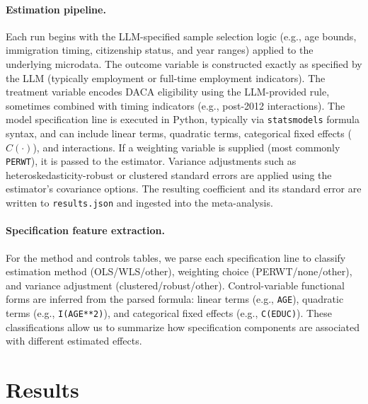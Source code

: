 \documentclass[11pt]{article}
\begin{document}
\paragraph{Estimation pipeline.} Each run begins with the LLM-specified sample selection logic (e.g., age bounds, immigration timing, citizenship status, and year ranges) applied to the underlying microdata. The outcome variable is constructed exactly as specified by the LLM (typically employment or full-time employment indicators). The treatment variable encodes DACA eligibility using the LLM-provided rule, sometimes combined with timing indicators (e.g., post-2012 interactions). The model specification line is executed in Python, typically via \texttt{statsmodels} formula syntax, and can include linear terms, quadratic terms, categorical fixed effects ($C(\cdot)$), and interactions. If a weighting variable is supplied (most commonly \texttt{PERWT}), it is passed to the estimator. Variance adjustments such as heteroskedasticity-robust or clustered standard errors are applied using the estimator's covariance options. The resulting coefficient and its standard error are written to \texttt{results.json} and ingested into the meta-analysis.

\paragraph{Specification feature extraction.} For the method and controls tables, we parse each specification line to classify estimation method (OLS/WLS/other), weighting choice (PERWT/none/other), and variance adjustment (clustered/robust/other). Control-variable functional forms are inferred from the parsed formula: linear terms (e.g., \texttt{AGE}), quadratic terms (e.g., \texttt{I(AGE**2)}), and categorical fixed effects (e.g., \texttt{C(EDUC)}). These classifications allow us to summarize how specification components are associated with different estimated effects.

\section{Results}

\begin{table}[htbp]
\centering
\caption{Summary statistics for reported estimates}
\small
\resizebox{\textwidth}{!}{}
\caption*{\textbf{Notes:} The table reports distributional statistics for point estimates, standard errors, and sample sizes across all valid LLM-generated specifications. The inverse-SE weighted effect-size row uses weights $1/\max(SE, q_{0.25})$, where $q_{0.25}$ is the 25th percentile of $SE$, for the mean, SD, and percentiles; minimum and maximum are the sample extrema. Sample size statistics use the number of observations actually included in each executed model after the LLM-specified sample restrictions and data cleaning steps. Estimates with $|\hat{\beta}|>1$ are excluded by construction. Standard errors in this table are rounded for display, so very small positive values may appear as 0.000.}
\label{tab:summary}
\end{table}
\end{document}
